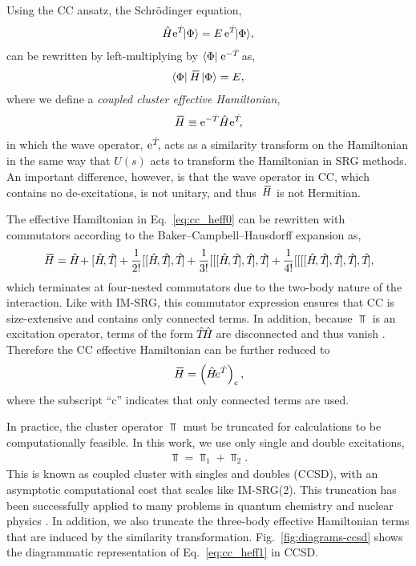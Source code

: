 \documentclass[thesis.tex]{subfiles}
\begin{document}
Using the CC ansatz, the Schr\"odinger equation,
\begin{align} \label{eq:cc_schrodeq}
  \hat{H}\hspace{-1.5pt} \operatorname{e}^{\hat{T}\hspace{-2pt}} \hspace{1pt}\lvert \Phi \rangle = E \operatorname{e}^{\hat{T}\hspace{-2pt}} \hspace{1pt}\lvert \Phi \rangle,
\end{align}
can be rewritten by left-multiplying by $\langle \Phi |\hspace{1pt} \operatorname{e}^{-\hat{T}\hspace{-2pt}}$ as,
\begin{align*}
  \refbra\EHam\refket = E,
\end{align*}
where we define a \textit{coupled cluster effective Hamiltonian},
\begin{align} \label{eq:cc_heff0}
  \EHam \equiv \E^{-\Top} \Ham \E^{\Top},
\end{align}
in which the wave operator, $\operatorname{e}^{\hat{T}\hspace{-2pt}}$, acts as a similarity transform on the Hamiltonian in the same way that $\hat{U}(s)$ acts to transform the Hamiltonian in SRG methods.  An important difference, however, is that the wave operator in CC, which contains no de-excitations, is not unitary, and thus $\EHam$ is not Hermitian.

The effective Hamiltonian in Eq.\ \eqref{eq:cc_heff0} can be rewritten with commutators according to the Baker--Campbell--Hausdorff expansion as,
\begin{align*}
  \EHam = \Ham + [\Ham, \Top] + \frac{1}{2!} [[\Ham, \Top], \Top] + \frac{1}{3!} [[[\Ham, \Top], \Top], \Top] + \frac{1}{4!} [[[[\Ham, \Top], \Top], \Top], \Top],
\end{align*}
which terminates at four-nested commutators due to the two-body nature of the interaction.  Like with IM-SRG, this commutator expression ensures that CC is size-extensive and contains only connected terms.  In addition, because $\Top$ is an excitation operator, terms of the form $\hat{T}\hspace{-2pt}\hat{H}\hspace{-1.5pt}$ are disconnected and thus vanish \cite{SHAVITT2009}.  Therefore the CC effective Hamiltonian can be further reduced to
\begin{align} \label{eq:cc_heff1}
  \EHam = \left(\Ham e^{\hat{T}}\right)_{\mathrm{c}},
\end{align}
where the subscript ``$\mathrm{c}$'' indicates that only connected terms are used.

In practice, the cluster operator $\Top$ must be truncated for calculations to be computationally feasible.  In this work, we use only single and double excitations,
\begin{align*}
  \Top = \Top_{1} + \Top_{2}.
\end{align*}
This is known as coupled cluster with singles and doubles (CCSD), with an asymptotic computational cost that scales like IM-SRG(2).  This truncation has been successfully applied to many problems in quantum chemistry \cite{BARTLETT2007291} and nuclear physics \cite{HAGEN2014096302}.  In addition, we also truncate the three-body effective Hamiltonian terms that are induced by the similarity transformation.  Fig.\ \ref{fig:diagrams-ccsd} shows the diagrammatic representation of Eq.\ \eqref{eq:cc_heff1} in CCSD.
\end{document}
